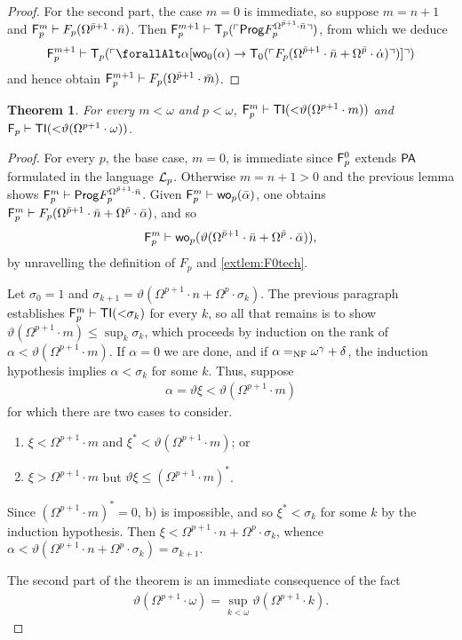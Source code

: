 \documentclass[UKenglish,cleveref,DIV=12]{scrartcl}
\let\forall\forallAlt
\newtheorem{theorem}{Theorem}
\theoremstyle{definition}
\theoremstyle{definition}
\begin{document}
\begin{proof}
For the second part, the case $m=0$ is immediate, so suppose $m=n+1$ and $\mathsf{F}_p^m\vdash
F_p(\Omega^{\bar p+1}\cdot\bar n)$. Then
$\mathsf{F}_p^{m+1}\vdash\mathsf{T}_p(\ulcorner{\mathsf{Prog}F_p^{\Omega^{\bar p+1}\cdot\bar n}}\urcorner)$, from which we deduce
\begin{align*}
  \F_p^{m+1}\proves\T_p(\gn{\forall\alpha[\wo_0(\alpha)\rightarrow\T_0(\gn{F_p(\Omega^{\bar p+1}\cdot\bar n+\Omega^{\bar p}\cdot\dot\alpha)})]})
\end{align*}
and hence obtain $\mathsf{F}_p^{m+1}\vdash F_p(\Omega^{\bar p+1}\cdot\bar m)$.
\end{proof}
\begin{theorem}\label{extthm:Fplowerbound}
 For every $m<\omega$ and $p<\omega$,
$\mathsf{F}_p^{m}\vdash\mathsf{TI}(\mathord<\vartheta(\Omega^{p+1}\cdot m))$ and
$\mathsf{F}_p\vdash\mathsf{TI}(\mathord<\vartheta(\Omega^{p+1}\cdot\omega))$.
\end{theorem}
\begin{proof}
For every $p$, the base case, $m=0$, is immediate since $\mathsf{F}_p^0$ extends $\mathsf{PA}$
formulated in the language $\mathcal{L}_p$. Otherwise $m=n+1>0$ and the previous lemma
shows $\mathsf{F}_p^m\vdash\mathsf{Prog} F_p^{\Omega^{\bar p+1}\cdot\bar n}$. Given $\mathsf{F}_p^m\vdash
\mathsf{wo}_p(\bar \alpha)$, one obtains $\mathsf{F}_p^m\vdash F_p(\Omega^{\bar p+1}\cdot\bar
n+\Omega^{\bar p}\cdot\bar\alpha)$, and so
\begin{align*}
  \mathsf{F}_p^m\vdash\mathsf{wo}_p(\vartheta(\Omega^{\bar p+1}\cdot\bar n+\Omega^{\bar p}\cdot\bar\alpha)),
\end{align*}
by unravelling the definition of $F_p$ and \cref{extlem:F0tech}.

Let $\sigma_0=1$ and $\sigma_{k+1}=\vartheta(\Omega^{p+1}\cdot
n+\Omega^p\cdot\sigma_k)$. The previous paragraph establishes $\mathsf{F}_p^m\vdash
\mathsf{TI}(\mathord<\sigma_k)$ for every $k$, so all that remains is to show
$\vartheta(\Omega^{p+1}\cdot m)\le\sup_k\sigma_k$, which proceeds by induction
on the rank of $\alpha<\vartheta(\Omega^{p+1}\cdot m)$. If $\alpha=0$ we are
done, and if $\alpha=_{\mathrm{NF}}\omega^\gamma+\delta$, the induction hypothesis implies
$\alpha<\sigma_k$ for some $k$. Thus, suppose
\begin{gather*}
  \alpha=\vartheta\xi<\vartheta(\Omega^{p+1}\cdot m)
\end{gather*}
for which there are two cases to consider.
\begin{enumerate}
 \item $\xi<\Omega^{p+1}\cdot m$ and $\xi^*<\vartheta(\Omega^{p+1}\cdot m)$; or
 \item $\xi>\Omega^{p+1}\cdot m$ but $\vartheta\xi\le(\Omega^{p+1}\cdot m)^*$.
\end{enumerate}
Since $(\Omega^{p+1}\cdot m)^*=0$, b) is impossible, and so
$\xi^*<\sigma_k$ for some $k$ by the induction hypothesis. Then
$\xi<\Omega^{p+1}\cdot n+\Omega^p\cdot\sigma_k$, whence
$\alpha<\vartheta(\Omega^{p+1}\cdot n+\Omega^p\cdot\sigma_k)=\sigma_{k+1}$.

The second part of the theorem is an immediate consequence of the fact
\begin{align*}
  \vartheta(\Omega^{p+1}\cdot \omega)=\sup_{k<\omega}\vartheta(\Omega^{p+1}\cdot k).
\end{align*}
\end{proof}
\end{document}

